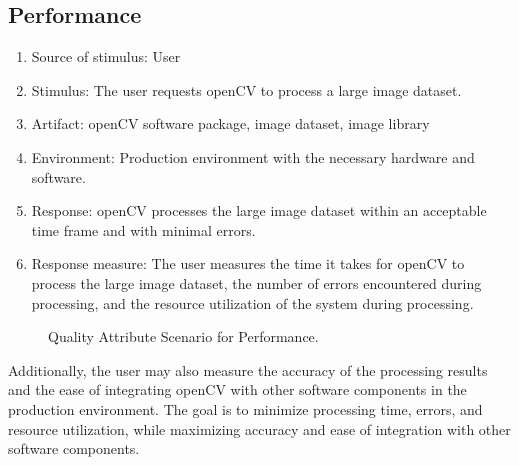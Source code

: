 \subsection{Performance\label{subSection::PerformanceQA}}
\begin{enumerate}
    \item Source of stimulus: User
    \item Stimulus: The user requests openCV to process a large image dataset.
    \item Artifact: openCV software package, image dataset, image library
    \item Environment: Production environment with the necessary hardware and software.
    \item Response: openCV processes the large image dataset within an acceptable time frame and with minimal errors.
    \item Response measure: The user measures the time it takes for openCV to process the large image dataset, the number of errors encountered during processing, and the resource utilization of the system during processing.
\end{enumerate}
\begin{figure}[H]
\centering
{}
\caption{\label{Figure::Quality Attribute Scenario for Performance} Quality Attribute Scenario for Performance.}
\end{figure}
Additionally, the user may also measure the accuracy of the processing results and the ease of integrating openCV with other software components in the production environment. The goal is to minimize processing time, errors, and resource utilization, while maximizing accuracy and ease of integration with other software components.
